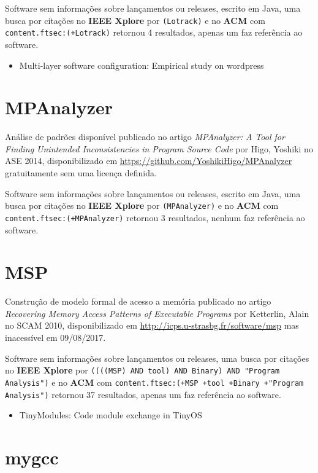 Software sem informações sobre lançamentos ou releases,
escrito em Java,
uma busca por citações no {\bf IEEE Xplore} por
\texttt{(Lotrack)}
e no {\bf ACM} com
\texttt{content.ftsec:(+Lotrack)}
retornou
4 resultados,
apenas um faz referência ao software.

\begin{itemize}
\item Multi-layer software configuration: Empirical study on wordpress
\end{itemize}

\section{MPAnalyzer}

Análise de padrões disponível
publicado no artigo {\it MPAnalyzer: A Tool for Finding Unintended Inconsistencies in Program Source Code}
por Higo, Yoshiki
no ASE 2014,
disponibilizado em \url{https://github.com/YoshikiHigo/MPAnalyzer}
gratuitamente
sem uma licença definida.

Software sem informações sobre lançamentos ou releases,
escrito em Java,
uma busca por citações no {\bf IEEE Xplore} por
\texttt{(MPAnalyzer)}
e no {\bf ACM} com
\texttt{content.ftsec:(+MPAnalyzer)}
retornou
3 resultados,
nenhum faz referência ao software.


\section{MSP}

Construção de modelo formal de acesso a memória
publicado no artigo {\it Recovering Memory Access Patterns of Executable Programs}
por Ketterlin, Alain
no SCAM 2010,
disponibilizado em \url{http://icps.u-strasbg.fr/software/msp}
mas inacessível em 09/08/2017.

Software sem informações sobre lançamentos ou releases,
uma busca por citações no {\bf IEEE Xplore} por
\texttt{((((MSP) AND tool) AND Binary) AND "Program Analysis")}
e no {\bf ACM} com
\texttt{content.ftsec:(+MSP +tool +Binary +"Program Analysis")}
retornou
37 resultados,
apenas um faz referência ao software.

\begin{itemize}
\item TinyModules: Code module exchange in TinyOS
\end{itemize}

\section{mygcc}


